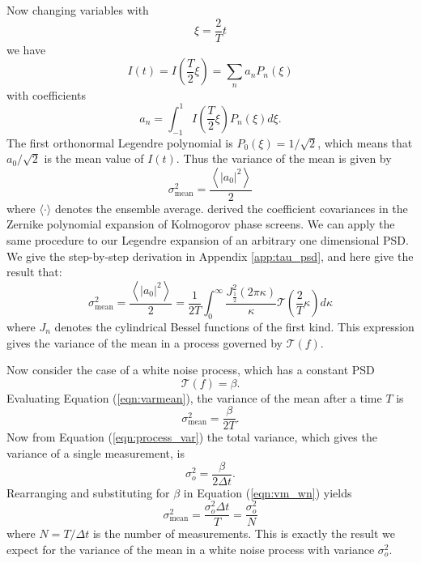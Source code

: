 \documentclass[11pt,preprint]{aastex}
\begin{document}
Now changing variables with
\begin{equation}
\xi = \frac{2}{T}t
\end{equation}
we have
\begin{equation}
I(t) = I\left(\frac{T}{2}\xi\right) = \sum_n a_n P_n(\xi)
\label{eqn:basisexpansion}
\end{equation}
with coefficients
\begin{equation}
a_n = \int_{-1}^{1} I\left(\frac{T}{2}\xi\right)P_n(\xi) d\xi.
\label{eqn:expansecoeff}
\end{equation}
The first orthonormal Legendre polynomial is $P_0(\xi) = 1/\sqrt{2}$, which means that $a_0/\sqrt{2}$ is the mean value of $I(t)$.  Thus the variance of the mean is given by
\begin{equation}
\sigma_\mathrm{mean}^2 = \frac{\left\langle \left|a_0\right|^2 \right\rangle}{2}
\label{eqn:varmean_def}
\end{equation}
where $\langle \cdot \rangle$ denotes the ensemble average.  \citet{1976JOSA...66..207N} derived the coefficient covariances in the Zernike polynomial expansion of Kolmogorov phase screens.  We can apply the same procedure to our Legendre expansion of an arbitrary one dimensional PSD.  We give the step-by-step derivation in Appendix \ref{app:tau_psd}, and here give the result that:
\begin{equation}
\sigma_\mathrm{mean}^2 = \frac{\left\langle \left|a_0\right|^2 \right\rangle}{2} = \frac{1}{2T}  \int_0^{\infty} \frac{ J_{\frac{1}{2}}^2(2\pi \kappa)}{\kappa} \mathcal{T}\left( \frac{2}{T} \kappa \right) d\kappa
\label{eqn:varmean}
\end{equation}
where $J_n$ denotes the cylindrical Bessel functions of the first kind.  This expression gives the variance of the mean in a process governed by $\mathcal{T}(f)$.

Now consider the case of a white noise process, which has a constant PSD
\begin{equation}
\mathcal{T}(f) = \beta.
\end{equation}
Evaluating Equation (\ref{eqn:varmean}), the variance of the mean after a time $T$ is 
\begin{equation}
\sigma_\mathrm{mean}^2 = \frac{\beta}{2T}.
\label{eqn:vm_wn}
\end{equation}
Now from Equation (\ref{eqn:process_var}) the total variance, which gives the variance of a single measurement, is
\begin{equation}
\sigma_o^2  = \frac{\beta}{2\Delta t}.
\end{equation}
Rearranging and substituting for $\beta$ in Equation (\ref{eqn:vm_wn}) yields
\begin{equation}
\sigma_\mathrm{mean}^2 =  \frac{\sigma_o^2 \Delta t}{T} = \frac{\sigma_o^2}{N}
\end{equation}
where $N = T/\Delta t$ is the number of measurements.  This is exactly the result we expect for the variance of the mean in a white noise process with variance $\sigma^2_o$. 
\end{document}
